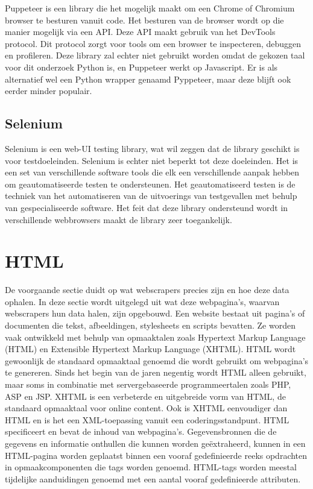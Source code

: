 Puppeteer is een library die het mogelijk maakt om een Chrome of Chromium browser te besturen vanuit code. Het besturen van de browser wordt op die manier mogelijk via een API. Deze API maakt gebruik van het DevTools protocol. Dit protocol zorgt voor tools om een browser te inspecteren, debuggen en profileren. Deze library zal echter niet gebruikt worden omdat de gekozen taal voor dit onderzoek Python is, en Puppeteer werkt op Javascript. Er is als alternatief wel een Python wrapper genaamd Pyppeteer, maar deze blijft ook eerder minder populair.

\subsection{Selenium}

Selenium is een web-UI testing library, wat wil zeggen dat de library geschikt is voor testdoeleinden. Selenium is echter niet beperkt tot deze doeleinden. Het is een set van verschillende software tools die elk een verschillende aanpak hebben om geautomatiseerde testen te ondersteunen. Het geautomatiseerd testen is de techniek van het automatiseren van de uitvoerings van testgevallen met behulp van gespecialiseerde software. Het feit dat deze library ondersteund wordt in verschillende webbrowsers maakt de library zeer toegankelijk.


\section{HTML}
De voorgaande sectie duidt op wat webscrapers precies zijn en hoe deze data ophalen. In deze sectie wordt uitgelegd uit wat deze webpagina's, waarvan webscrapers hun data halen, zijn opgebouwd.
Een website bestaat uit pagina's of documenten die tekst, afbeeldingen, stylesheets en scripts bevatten. Ze worden vaak ontwikkeld met behulp van opmaaktalen zoals Hypertext Markup Language (HTML) en Extensible Hypertext Markup Language (XHTML). HTML wordt gewoonlijk de standaard opmaaktaal genoemd die wordt gebruikt om webpagina's te genereren. Sinds het begin van de jaren negentig wordt HTML alleen gebruikt, maar soms in combinatie met servergebaseerde programmeertalen zoals PHP, ASP en JSP.  XHTML is een verbeterde en uitgebreide vorm van HTML, de standaard opmaaktaal voor online content. Ook is XHTML eenvoudiger dan HTML en is het een XML-toepassing vanuit een coderingsstandpunt. HTML specificeert en bevat de inhoud van webpagina's. Gegevensbronnen die de gegevens en informatie onthullen die kunnen worden geëxtraheerd,  kunnen in een HTML-pagina worden geplaatst binnen een vooraf gedefinieerde reeks opdrachten in opmaakcomponenten die tags worden genoemd. HTML-tags worden meestal tijdelijke aanduidingen genoemd met een aantal vooraf gedefinieerde attributen.

